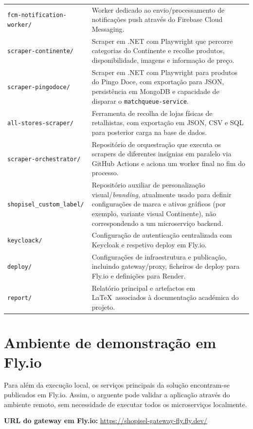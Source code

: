 \documentclass[a4paper,11pt]{article}
\let\oldsection\section
\renewcommand{\section}{\Needspace{8\baselineskip}\oldsection}
\begin{document}
\begin{longtable}{>{\raggedright\arraybackslash}p{4.5cm} >{\raggedright\arraybackslash}p{8.8cm}}
\texttt{fcm-notification-worker/} & Worker dedicado ao envio/processamento de notifica\c{c}\~oes push atrav\'es do Firebase Cloud Messaging. \\
\texttt{scraper-continente/} & Scraper em .NET com Playwright que percorre categorias do Continente e recolhe produtos, disponibilidade, imagens e informa\c{c}\~ao de pre\c{c}o. \\
\texttt{scraper-pingodoce/} & Scraper em .NET com Playwright para produtos do Pingo Doce, com exporta\c{c}\~ao para JSON, persist\^encia em MongoDB e capacidade de disparar o \texttt{matchqueue-service}. \\
\texttt{all-stores-scraper/} & Ferramenta de recolha de lojas f\'isicas de retalhistas, com exporta\c{c}\~ao em JSON, CSV e SQL para posterior carga na base de dados. \\
\texttt{scraper-orchestrator/} & Reposit\'orio de orquestra\c{c}\~ao que executa os scrapers de diferentes ins\'ignias em paralelo via GitHub Actions e aciona um worker final no fim do processo. \\
\texttt{shopisel\_custom\_label/} & Reposit\'orio auxiliar de personaliza\c{c}\~ao visual/\emph{branding}, atualmente usado para definir configura\c{c}\~oes de marca e ativos gr\'aficos (por exemplo, variante visual Continente), n\~ao correspondendo a um microservi\c{c}o backend. \\
\texttt{keycloack/} & Configura\c{c}\~ao de autentica\c{c}\~ao centralizada com Keycloak e respetivo deploy em Fly.io. \\
\texttt{deploy/} & Configura\c{c}\~oes de infraestrutura e publica\c{c}\~ao, incluindo gateway/proxy, ficheiros de deploy para Fly.io e defini\c{c}\~oes para Render. \\
\texttt{report/} & Relat\'orio principal e artefactos em \LaTeX\ associados \`a documenta\c{c}\~ao acad\'emica do projeto. \\
\end{longtable}
\section{Ambiente de demonstra\c{c}\~ao em Fly.io}

Para al\'em da execu\c{c}\~ao local, os servi\c{c}os principais da solu\c{c}\~ao encontram-se publicados em Fly.io. Assim, o arguente pode validar a aplica\c{c}\~ao atrav\'es do ambiente remoto, sem necessidade de executar todos os microservi\c{c}os localmente.

\textbf{URL do gateway em Fly.io:} \url{https://shopisel-gateway-fly.fly.dev/}
\end{document}
